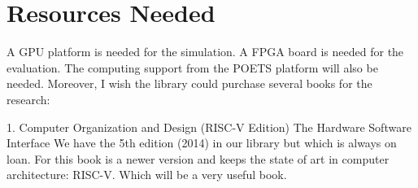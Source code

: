 \section{Resources Needed}
A GPU platform is needed for the simulation. A FPGA board is needed for the evaluation. The computing support from the POETS platform will also be needed. Moreover, I wish the library could purchase several books for the research:
\par 1.     Computer Organization and Design (RISC-V Edition) The Hardware Software Interface
We have the 5th edition (2014) in our library but which is always on loan. For this book is a newer version and keeps the state of art in computer architecture: RISC-V. Which will be a very useful book.